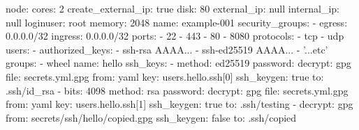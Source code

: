 
node:
  cores: 2
  create\_external\_ip: true
  disk: 80
  external\_ip: null
  internal\_ip: null
  loginuser: root
  memory: 2048
  name: example-001
  security\_groups:
  - egress: 0.0.0.0/32
    ingress: 0.0.0.0/32
    ports:
    - 22
    - 443
    - 80
    - 8080
    protocols:
    - tcp
    - udp
  users:
  - authorized\_keys:
    - ssh-rsa AAAA...
    - ssh-ed25519 AAAA...
    - '...etc'
    groups:
    - wheel
    name: hello
    ssh\_keys:
    - method: ed25519
      password:
        decrypt: gpg
        file: secrets.yml.gpg
        from: yaml
        key: users.hello.ssh[0]
      ssh\_keygen: true
      to: .ssh/id\_rsa
    - bits: 4098
      method: rsa
      password:
        decrypt: gpg
        file: secrets.yml.gpg
        from: yaml
        key: users.hello.ssh[1]
      ssh\_keygen: true
      to: .ssh/testing
    - decrypt: gpg
      from: secrets/ssh/hello/copied.gpg
      ssh\_keygen: false
      to: .ssh/copied
